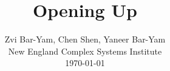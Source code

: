 \documentclass[onecolumn,journal]{IEEEtran}
\begin{document}
\title{\color{Brown} Opening Up \\
\vspace{-0.35ex}}
\author{\large Zvi Bar-Yam, Chen Shen, Yaneer Bar-Yam \\ New England Complex Systems Institute \\
 \today 
  \vspace{-10ex} \\ 

   
\bigskip
\bigskip

\textbf{}
 }
    
\maketitle


\flushbottom %



\thispagestyle{empty} %




\renewcommand{\thefootnote}{\fnsymbol{footnote}}
\end{document}
